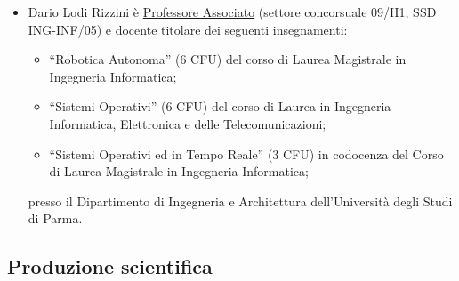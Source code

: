 \documentclass[11pt]{article}
\begin{document}
\begin{itemize}
\item Dario Lodi Rizzini \`e \ul{Professore Associato} (settore concorsuale 09/H1, SSD ING-INF/05) 
e \ul{docente titolare} dei seguenti insegnamenti: 
%
\begin{itemize}
\item ``Robotica Autonoma'' (6 CFU) del corso di Laurea Magistrale in Ingegneria Informatica; 
\item ``Sistemi Operativi'' (6 CFU) del corso di Laurea in Ingegneria Informatica, Elettronica e delle Telecomunicazioni;
\item ``Sistemi Operativi ed in Tempo Reale'' (3 CFU) in codocenza del Corso di Laurea Magistrale in Ingegneria Informatica;
\end{itemize}
%
presso il Dipartimento di Ingegneria e Architettura dell'Universit\`a degli Studi di Parma. 
\end{itemize}


\subsection*{Produzione scientifica}
\end{document}
